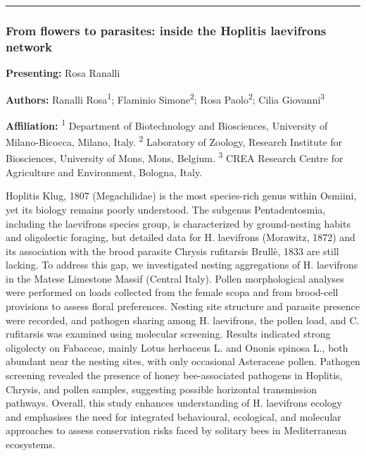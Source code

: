 \documentclass[
  letterpaper,
  DIV=11,
  numbers=noendperiod]{scrartcl}
\begin{document}
\begin{center}\rule{0.5\linewidth}{0.5pt}\end{center}

\subsubsection{From flowers to parasites: inside the Hoplitis laevifrons
network}\label{from-flowers-to-parasites-inside-the-hoplitis-laevifrons-network}

\textbf{Presenting:} Rosa Ranalli

\textbf{Authors:} Ranalli Rosa\textsuperscript{1}; Flaminio
Simone\textsuperscript{2}; Rosa Paolo\textsuperscript{2}; Cilia
Giovanni\textsuperscript{3}

\textbf{Affiliation:} \textsuperscript{1} Department of Biotechnology
and Biosciences, University of Milano-Bicocca, Milano, Italy.
\textsuperscript{2} Laboratory of Zoology, Research Institute for
Biosciences, University of Mons, Mons, Belgium. \textsuperscript{3} CREA
Research Centre for Agriculture and Environment, Bologna, Italy.

Hoplitis Klug, 1807 (Megachilidae) is the most species-rich genus within
Osmiini, yet its biology remains poorly understood. The subgenus
Pentadentosmia, including the laevifrons species group, is characterized
by ground-nesting habits and oligolectic foraging, but detailed data for
H. laevifrons (Morawitz, 1872) and its association with the brood
parasite Chrysis rufitarsis Brullè, 1833 are still lacking. To address
this gap, we investigated nesting aggregations of H. laevifrons in the
Matese Limestone Massif (Central Italy). Pollen morphological analyses
were performed on loads collected from the female scopa and from
brood-cell provisions to assess floral preferences. Nesting site
structure and parasite presence were recorded, and pathogen sharing
among H. laevifrons, the pollen load, and C. rufitarsis was examined
using molecular screening. Results indicated strong oligolecty on
Fabaceae, mainly Lotus herbaceus L. and Ononis spinosa L., both abundant
near the nesting sites, with only occasional Asteraceae pollen. Pathogen
screening revealed the presence of honey bee-associated pathogens in
Hoplitis, Chrysis, and pollen samples, suggesting possible horizontal
transmission pathways. Overall, this study enhances understanding of H.
laevifrons ecology and emphasises the need for integrated behavioural,
ecological, and molecular approaches to assess conservation risks faced
by solitary bees in Mediterranean ecosystems.
\end{document}
